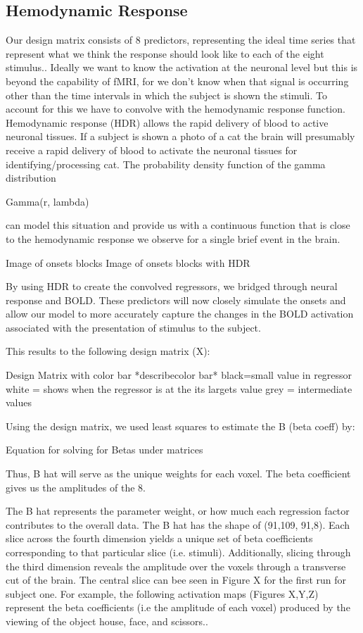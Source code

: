 \documentclass[11pt]{article}
\begin{document}
\subsection{Hemodynamic Response}
Our design matrix consists of 8 predictors, representing the ideal time series 
that represent what we think the response should look like to each of the eight 
stimulus.. Ideally we want to know the activation at the neuronal level but 
this is beyond the capability of fMRI, for we don’t know when that signal 
is occurring other than the time intervals in which the subject is shown the 
stimuli. To account for this we have to convolve with the hemodynamic response 
function. Hemodynamic response (HDR) allows the rapid delivery of blood to 
active neuronal tissues. If a subject is shown a photo of a cat the brain will 
presumably receive a rapid delivery of blood to activate the neuronal tissues 
for identifying/processing cat. The probability density function of the gamma 
distribution
	
	         Gamma(r, lambda)

can model this situation and provide us with a continuous function that is 
close to the hemodynamic response we observe for a single brief event in the 
brain.

		Image of onsets blocks
		Image of onsets blocks with HDR

By using HDR to create the convolved regressors, we bridged through neural 
response and BOLD. These predictors will now closely simulate the onsets and 
allow our model to more accurately capture the changes in the BOLD activation 
associated with the presentation of stimulus to the subject.

This results to the following design matrix (X):

     Design Matrix with color bar  *describecolor bar*
     black=small value in regressor
     white = shows when the regressor is at the its largets value
     grey = intermediate values

Using the design matrix, we used least squares to estimate the B (beta coeff) by:
                                                          
     Equation for solving for Betas under matrices

Thus, B hat will serve as the unique weights for each voxel. The beta 
coefficient gives us the amplitudes of the 8.

The B hat represents the parameter weight, or how much each regression factor 
contributes to the overall data. The B hat has the shape of (91,109, 91,8). 
Each slice across the fourth dimension yields a unique set of beta coefficients 
corresponding to that particular slice (i.e. stimuli). Additionally, slicing 
through the third dimension reveals the amplitude over the voxels through a 
transverse cut of the brain. The central slice can bee seen in Figure X for the 
first run for subject one.
For example, the following activation maps (Figures X,Y,Z) represent the beta 
coefficients (i.e the amplitude of each voxel) produced by the viewing of the 
object house, face, and scissors..
\end{document}
